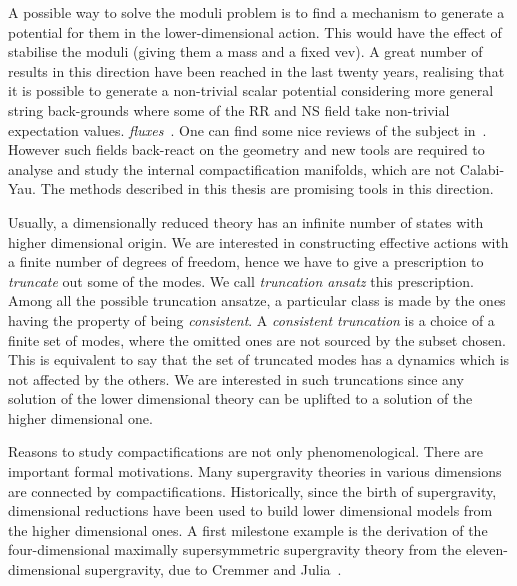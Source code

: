 \documentclass[draft]{phd}
\begin{document}
 A possible way to solve the moduli problem is to find a mechanism to generate a potential for them in the lower-dimensional action.
This would have the effect of stabilise the moduli (giving them a mass and a fixed vev).
A great number of results in this direction have been reached in the last twenty years, realising that it is possible to generate a non-trivial scalar potential 
considering more general string back-grounds where some of the RR and NS field take non-trivial expectation values. \emph{fluxes}~\cite{fluxcomp1, fluxcomp2, fluxcomp3}.
One can find some nice reviews of the subject in~\cite{DuffReviewComp, MarianaFluxReview, LustReviewComp, henlect}.
 However such fields back-react on the geometry and new tools are required to analyse and study the internal compactification manifolds, which are not Calabi-Yau.
 The methods described in this thesis are promising tools in this direction.
 
 Usually, a dimensionally reduced theory has an infinite number of states with higher dimensional origin.
 We are interested in constructing effective actions with a finite number of degrees of freedom, hence we have to give a prescription to \emph{truncate} out some of the modes.
 We call \emph{truncation ansatz} this prescription.
 Among all the possible truncation ansatze, a particular class is made by the ones having the property of being \emph{consistent}.
 A \emph{consistent truncation} is a choice of a finite set of modes, where the omitted ones are not sourced by the subset chosen. 
 This is equivalent to say that the set of truncated modes has a dynamics which is not affected by the others.
 We are interested in such truncations since any solution of the lower dimensional theory can be uplifted to a solution of the higher dimensional one.

		
		Reasons to study compactifications are not only phenomenological.
		There are important formal motivations.
		Many supergravity theories in various dimensions are connected by compactifications.
		Historically, since the birth of supergravity, dimensional reductions have been used to build lower dimensional models from the higher dimensional ones.		
		A first milestone example is the derivation of the four-dimensional maximally supersymmetric supergravity theory from the eleven-dimensional supergravity, due to Cremmer and Julia~\cite{CremmerJulia}.
		
\end{document}
